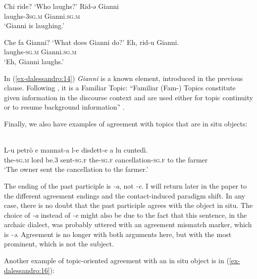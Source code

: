\documentclass[output=paper
,modfonts
,nonflat]{langsci/langscibook}
\begin{document}
\begin{exe} \settowidth{}
	\ex  \label{ex-dalessandro:13}\citet[9]{Paciaroni2017} \xlist
	\ex   Chi ride{?} 
	\glt `Who laughs{?}' 
	\ex
	\gll  Rid-ə     Gianni\\ 
	laughs-\textsc{3sg.m} Gianni.\textsc{sg.m}\\ 
	\glt `Gianni is laughing.'
	\endxlist
\end{exe}
\begin{exe} \settowidth{}
	\ex \label{ex-dalessandro:14} \citet[9]{Paciaroni2017} \xlist
	\ex   Che fa Gianni? 
	\glt `What does Gianni do?' 
	\ex
	\gll  Eh,   rid-u     Gianni.\\ 
	{ } laughs-\textsc{sg.m} Gianni.\textsc{sg.m}\\ 
	\glt `Eh, Gianni laughs.'
	\endxlist
\end{exe}
In (\ref{ex-dalessandro:14}) \textit{Gianni} is a known element, introduced in the previous clause. Following \citet{Frascarelli2012}, it is a Familiar Topic: “Familiar (Fam-) Topics constitute given information in the discourse context and are used either for topic continuity or to resume background information” \citep[181]{Frascarelli2012}. 

Finally, we also have examples of agreement with topics that are in situ objects:

\begin{exe}
	\ex \label{ex-dalessandro:15}	\citet[93]{Rossi2008}\\
	\gll L-u     petrò e   mannat-a l-e   disdett-e a lu cuntedì.\\
	the-\textsc{sg.m}  lord  be.3  sent-\textsc{sg.f} the-\textsc{sg.f} cancellation-\textsc{sg.f} to the farmer\\
	\glt `The owner sent the cancellation to the farmer.'
\end{exe}
The ending of the past participle is \textit{-a}, not \textit{-e}. I will return later in the paper to the different agreement endings and the contact-induced paradigm shift. In any case, there is no doubt that the past participle agrees with the object in situ. The choice of \textit{-a} instead of \textit{-e} might also be due to the fact that this sentence, in the archaic dialect, was probably uttered with an agreement mismatch marker, which is \textit{-ə}. Agreement is no longer with both arguments here, but with the most prominent, which is not the subject. 

Another example of topic-oriented agreement with an in situ object is in (\ref{ex-dalessandro:16}):
\end{document}
